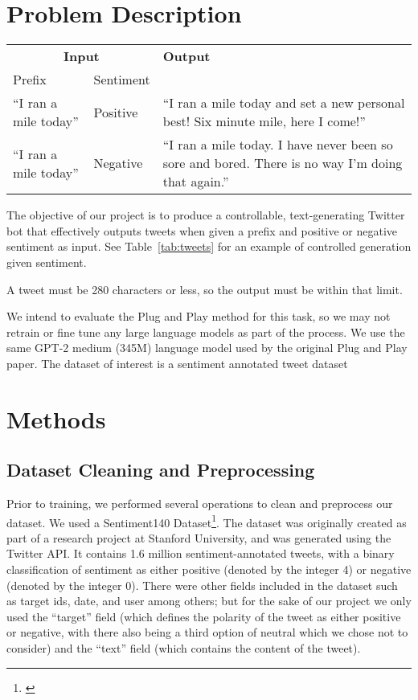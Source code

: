 \documentclass[11pt]{article}
\begin{document}
\section{Problem Description}
\begin{table*}
\centering
\begin{tabular}{llp{}}
\toprule
\multicolumn{2}{c}{\textbf{Input}} & \textbf{Output}\\
{Prefix} & {Sentiment} \\
\midrule
{“I ran a mile today”} & {Positive} & {“I ran a mile today and set a new personal best! Six minute mile, here I come!”} \\
{“I ran a mile today”} & {Negative} & {“I ran a mile today. I have never been so sore and bored. There is no way I’m doing that again.”} \\
\bottomrule
\end{tabular}
\caption{Given the same prefix with different sentiments, output is steered towards the sentiment.}
\label{tab:tweets}
\end{table*}
The objective of our project is to produce a controllable, text-generating Twitter bot that effectively outputs tweets when given a prefix and positive or negative sentiment as input. See Table~\ref{tab:tweets} for an example of controlled generation given sentiment.

A tweet must be 280 characters or less, so the output must be within that limit.

We intend to evaluate the Plug and Play method for this task, so we may not retrain or fine tune any large language models as part of the process. We use the same GPT-2 medium (345M) language model used by the original Plug and Play paper. The dataset of interest is a sentiment annotated tweet dataset


\section{Methods}
\subsection{Dataset Cleaning and Preprocessing}
Prior to training, we performed several operations to clean and preprocess our dataset. We used a Sentiment140 Dataset\footnote{\citep{sentiment140-kaggle}}. The dataset was originally created as part of a research project at Stanford University, and was generated using the Twitter API. It contains 1.6 million sentiment-annotated tweets, with a binary classification of sentiment as either positive (denoted by the integer 4) or negative (denoted by the integer 0). There were other fields included in the dataset such as target ids, date, and user among others; but for the sake of our project we only used the “target” field (which defines the polarity of the tweet as either positive or negative, with there also being a third option of neutral which we chose not to consider) and the “text” field (which contains the content of the tweet). 
\end{document}
